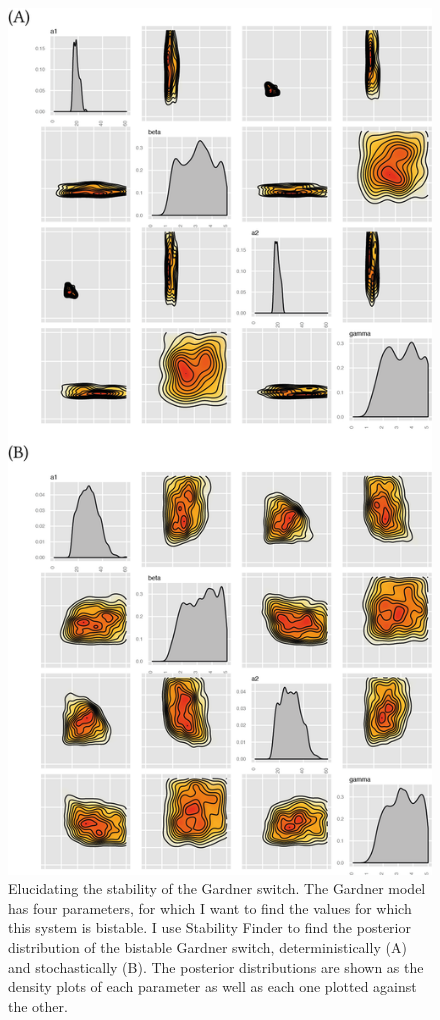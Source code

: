 \begin{figure}[htbp]
\begin{center}
	\includegraphics[scale=0.8]{../../chapters/chapterStabilityFinder/images/gardner_posteriors.png}
	\caption[The posterior distributions of the bistable Gardner toggle switch]{\label{fig:gard_post} Elucidating the stability of the Gardner switch. The Gardner model has four parameters, for which I want to find the values for which this system is bistable. I use Stability Finder to find the posterior distribution of the bistable Gardner switch, deterministically (A) and stochastically (B). The posterior distributions are shown as the density plots of each parameter as well as each one plotted against the other.  }
\end{center}
\end{figure}
